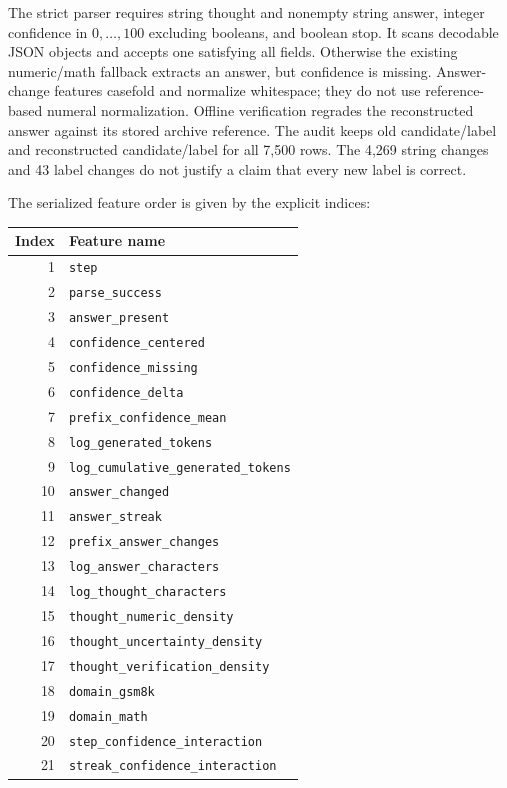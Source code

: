 The strict parser requires string thought and nonempty string answer, integer
confidence in \(0,\ldots,100\) excluding booleans, and boolean stop.
It scans decodable JSON objects and accepts one satisfying all fields.
Otherwise the existing numeric/math fallback extracts an answer, but confidence
is missing. Answer-change features casefold and normalize whitespace; they
do not use reference-based numeral normalization. Offline verification
regrades the reconstructed answer against its stored archive reference.
The audit keeps old candidate/label and reconstructed candidate/label for
all 7,500 rows. The 4,269 string changes and 43 label changes do not justify a
claim that every new label is correct.

The serialized feature order is given by the explicit indices:
\begin{center}
\begin{tabular}{rl}
\toprule
Index & Feature name\\
\midrule
1 & \texttt{step}\\
2 & \texttt{parse\_success}\\
3 & \texttt{answer\_present}\\
4 & \texttt{confidence\_centered}\\
5 & \texttt{confidence\_missing}\\
6 & \texttt{confidence\_delta}\\
7 & \texttt{prefix\_confidence\_mean}\\
8 & \texttt{log\_generated\_tokens}\\
9 & \texttt{log\_cumulative\_generated\_tokens}\\
10 & \texttt{answer\_changed}\\
11 & \texttt{answer\_streak}\\
12 & \texttt{prefix\_answer\_changes}\\
13 & \texttt{log\_answer\_characters}\\
14 & \texttt{log\_thought\_characters}\\
15 & \texttt{thought\_numeric\_density}\\
16 & \texttt{thought\_uncertainty\_density}\\
17 & \texttt{thought\_verification\_density}\\
18 & \texttt{domain\_gsm8k}\\
19 & \texttt{domain\_math}\\
20 & \texttt{step\_confidence\_interaction}\\
21 & \texttt{streak\_confidence\_interaction}\\
\bottomrule
\end{tabular}
\end{center}
